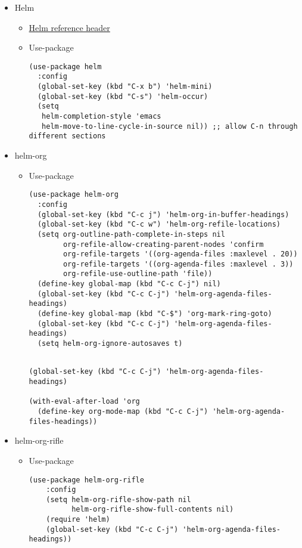 \documentclass{article}
\begin{document}
\begin{itemize}
\begin{itemize}
\begin{verbatim}
\end{verbatim}
\end{itemize}
\item Helm
\label{sec:orgd87efbd}
\begin{itemize}
\item \href{basecamp.org}{Helm reference header}
\label{sec:org134ba6e}
\item Use-package
\label{sec:org492c14d}
\begin{verbatim}
(use-package helm
  :config
  (global-set-key (kbd "C-x b") 'helm-mini)
  (global-set-key (kbd "C-s") 'helm-occur)
  (setq
   helm-completion-style 'emacs
   helm-move-to-line-cycle-in-source nil)) ;; allow C-n through different sections
\end{verbatim}
\end{itemize}
\item helm-org
\label{sec:orgeadab2a}
\begin{itemize}
\item Use-package
\label{sec:org788c418}
\begin{verbatim}
(use-package helm-org
  :config
  (global-set-key (kbd "C-c j") 'helm-org-in-buffer-headings)
  (global-set-key (kbd "C-c w") 'helm-org-refile-locations)
  (setq org-outline-path-complete-in-steps nil
        org-refile-allow-creating-parent-nodes 'confirm
        org-refile-targets '((org-agenda-files :maxlevel . 20))
        org-refile-targets '((org-agenda-files :maxlevel . 3))
        org-refile-use-outline-path 'file))
  (define-key global-map (kbd "C-c C-j") nil)
  (global-set-key (kbd "C-c C-j") 'helm-org-agenda-files-headings)
  (define-key global-map (kbd "C-$") 'org-mark-ring-goto)
  (global-set-key (kbd "C-c C-j") 'helm-org-agenda-files-headings)
  (setq helm-org-ignore-autosaves t)


\end{verbatim}
\begin{verbatim}
(global-set-key (kbd "C-c C-j") 'helm-org-agenda-files-headings)

(with-eval-after-load 'org
  (define-key org-mode-map (kbd "C-c C-j") 'helm-org-agenda-files-headings))

\end{verbatim}
\end{itemize}

\item helm-org-rifle
\label{sec:orgb8d6915}
\begin{itemize}
\item Use-package
\label{sec:orgfe1f639}
\begin{verbatim}
(use-package helm-org-rifle
    :config
    (setq helm-org-rifle-show-path nil
          helm-org-rifle-show-full-contents nil)
    (require 'helm)
    (global-set-key (kbd "C-c C-j") 'helm-org-agenda-files-headings))


\end{verbatim}
\end{itemize}
\end{itemize}
\end{document}
